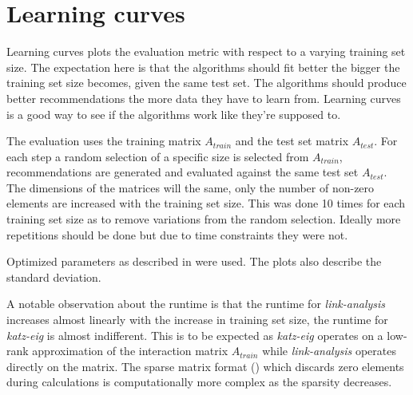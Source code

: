 
\section{Learning curves}\label{sec:graphs:learning_curves}

Learning curves plots the evaluation metric with respect to a varying training set size. The expectation here is that the algorithms should fit better the bigger the training set size becomes, given the same test set. The algorithms should produce better recommendations the more data they have to learn from. Learning curves is a good way to see if the algorithms work like they're supposed to.

The evaluation uses the training matrix $A_{train}$ and the test set matrix $A_{test}$. For each step a random selection of a specific size is selected from $A_{train}$, recommendations are generated and evaluated against the same test set $A_{test}$. The dimensions of the matrices will the same, only the number of non-zero elements are increased with the training set size. This was done 10 times for each training set size as to remove variations from the random selection. Ideally more repetitions should be done but due to time constraints they were not.

Optimized parameters as described in  were used. The plots also describe the standard deviation.

\FloatBarrier

A notable observation about the runtime is that the runtime for \textit{link-analysis} increases almost linearly with the increase in training set size, the runtime for \textit{katz-eig} is almost indifferent. This is to be expected as \textit{katz-eig} operates on a low-rank approximation of the interaction matrix $A_{train}$ while \textit{link-analysis} operates directly on the matrix. The sparse matrix format () which discards zero elements during calculations is computationally more complex as the sparsity decreases.


